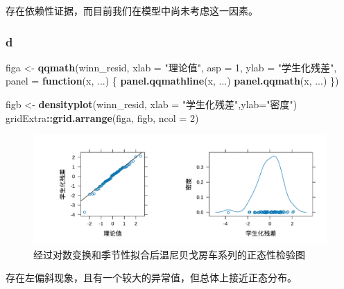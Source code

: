 \documentclass[
]{article}
\newenvironment{Shaded}{\begin{snugshade}}{\end{snugshade}}
\newcommand{\AttributeTok}[1]{\textcolor[rgb]{0.13,0.29,0.53}{#1}}
\newcommand{\ControlFlowTok}[1]{\textcolor[rgb]{0.13,0.29,0.53}{\textbf{#1}}}
\newcommand{\DecValTok}[1]{\textcolor[rgb]{0.00,0.00,0.81}{#1}}
\newcommand{\FunctionTok}[1]{\textcolor[rgb]{0.13,0.29,0.53}{\textbf{#1}}}
\newcommand{\NormalTok}[1]{#1}
\newcommand{\OtherTok}[1]{\textcolor[rgb]{0.56,0.35,0.01}{#1}}
\newcommand{\SpecialCharTok}[1]{\textcolor[rgb]{0.81,0.36,0.00}{\textbf{#1}}}
\newcommand{\StringTok}[1]{\textcolor[rgb]{0.31,0.60,0.02}{#1}}
\begin{document}
存在依赖性证据，而目前我们在模型中尚未考虑这一因素。

\hypertarget{d-6}{%
\subsubsection*{d}\label{d-6}}

\begin{Shaded}
\begin{Highlighting}[]
\NormalTok{figa }\OtherTok{\textless{}{-}} 
  \FunctionTok{qqmath}\NormalTok{(winn\_resid, }\AttributeTok{xlab =} \StringTok{"理论值"}\NormalTok{,}
       \AttributeTok{asp =} \DecValTok{1}\NormalTok{,}
       \AttributeTok{ylab =} \StringTok{"学生化残差"}\NormalTok{,}
       \AttributeTok{panel =} \ControlFlowTok{function}\NormalTok{(x, ...) \{}
         \FunctionTok{panel.qqmathline}\NormalTok{(x, ...)}
         \FunctionTok{panel.qqmath}\NormalTok{(x, ...)}
\NormalTok{       \})}

\NormalTok{figb }\OtherTok{\textless{}{-}} \FunctionTok{densityplot}\NormalTok{(winn\_resid, }\AttributeTok{xlab =} \StringTok{"学生化残差"}\NormalTok{,}\AttributeTok{ylab=}\StringTok{"密度"}\NormalTok{)}
\NormalTok{gridExtra}\SpecialCharTok{::}\FunctionTok{grid.arrange}\NormalTok{(figa, figb, }\AttributeTok{ncol =} \DecValTok{2}\NormalTok{)}
\end{Highlighting}
\end{Shaded}

\begin{figure}
\centering
\includegraphics{chapter3_files/figure-latex/winn-norm-1.pdf}
\caption{\label{fig:winn-norm}经过对数变换和季节性拟合后温尼贝戈房车系列的正态性检验图}
\end{figure}

存在左偏斜现象，且有一个较大的异常值，但总体上接近正态分布。
\end{document}
